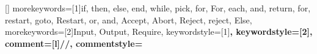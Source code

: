 \usepackage[T1]{fontenc}
\usepackage{amsmath, amsfonts}

\usepackage{thmtools}
\usepackage{mathtools} 
\usepackage{longtable} 

\usepackage{float}
\usepackage{color} %
\usepackage{tikz}
\usepackage{lscape}
\usetikzlibrary{positioning, calc, math}
\usepackage{tikz-cd} %
\usepackage{hyperref} %
\usepackage{listings} %
\usepackage{adjustbox} %
\usepackage{stmaryrd} %

\usepackage{booktabs} %


[]{}{
	morekeywords=[1]{if, then, else, end, while, pick, for, For, each, and, return, for, restart, goto,
			Restart, or, and, Accept, Abort, Reject, reject, Else},
	morekeywords=[2]{Input, Output, Require},
	keywordstyle=[1]\color{keywordsoneColor}\bfseries,
	keywordstyle=[2]\color{keywordstwoColor}\bfseries,
	comment=[l]{//},
	commentstyle=\color{purple}\ttfamily
}

\usepackage{todonotes}

\usepackage[lambda,
            advantage,
            adversary,
            probability,
            operators,
            keys,
            asymptotics,
            sets]{cryptocode}
